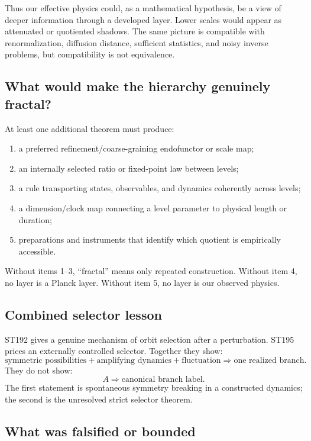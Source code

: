 \documentclass[11pt,a4paper]{article}
\begin{document}
Thus our effective physics could, as a mathematical hypothesis, be a view of deeper information through a developed layer. Lower scales would appear as attenuated or quotiented shadows. The same picture is compatible with renormalization, diffusion distance, sufficient statistics, and noisy inverse problems, but compatibility is not equivalence.

\subsection{What would make the hierarchy genuinely fractal?}

At least one additional theorem must produce:
\begin{enumerate}
\item a preferred refinement/coarse-graining endofunctor or scale map;
\item an internally selected ratio or fixed-point law between levels;
\item a rule transporting states, observables, and dynamics coherently across levels;
\item a dimension/clock map connecting a level parameter to physical length or duration;
\item preparations and instruments that identify which quotient is empirically accessible.
\end{enumerate}

Without items 1--3, ``fractal'' means only repeated construction. Without item 4, no layer is a Planck layer. Without item 5, no layer is our observed physics.

\subsection{Combined selector lesson}

ST192 gives a genuine mechanism of orbit selection after a perturbation. ST195 prices an externally controlled selector. Together they show:
\[
\text{symmetric possibilities}+\text{amplifying dynamics}+\text{fluctuation}
\Longrightarrow\text{one realized branch}.
\]
They do not show:
\[
A\Longrightarrow\text{canonical branch label}.
\]
The first statement is spontaneous symmetry breaking in a constructed dynamics; the second is the unresolved strict selector theorem.

\subsection{What was falsified or bounded}
\end{document}
